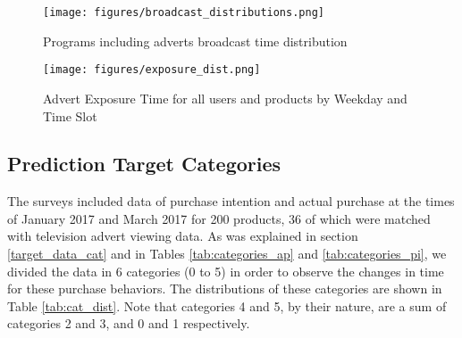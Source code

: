 \documentclass[review]{elsarticle}
\begin{document}
\begin{figure}[htp]
\centering
\texttt{[image: figures/broadcast\_distributions.png]}
\caption{Programs including adverts broadcast time distribution}
\label{fig:broadcast_dist}
\end{figure} 

\begin{figure}[htp]
\centering
\texttt{[image: figures/exposure\_dist.png]}
\caption{Advert Exposure Time for all users and products by Weekday and Time Slot}
\label{fig:exposure_dist}
\end{figure} 

\subsection{Prediction Target Categories}
\label{cat_dist}

The surveys included data of purchase intention and actual purchase at the times of January 2017 and March 2017 for 200 products, 36 of which were matched with television advert viewing data. As was explained in section \ref{target_data_cat} and in Tables \ref{tab:categories_ap} and \ref{tab:categories_pi}, we divided the data in 6 categories (0 to 5) in order to observe the changes in time for these purchase behaviors. The distributions of these categories are shown in Table \ref{tab:cat_dist}. Note that categories 4 and 5, by their nature, are a sum of categories 2 and 3, and 0 and 1 respectively. 
\end{document}
